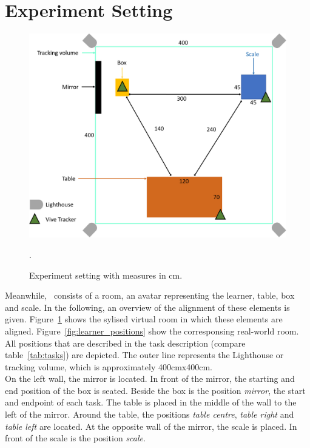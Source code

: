 \section{Experiment Setting}
\label{sec:experimentSetting}
\begin{figure}[H]
	\centering
	\includegraphics[width=\textwidth]{figures/study_setting.png}
	\caption[Experiment setting]{Experiment setting with measures in cm.}.
	\label{fig:study_setting}
\end{figure}
Meanwhile, \exgo\ consists of a room, an avatar representing the learner, table, box and scale. In the following, an overview of the alignment of these elements is given. Figure~\ref{fig:study_setting} shows the sylised virtual room in which these elements are aligned. Figure~\ref{fig:learner_positions} show the corresponsing real-world room. All positions that are described in the task description (compare table~\ref{tab:tasks}) are depicted. The outer line represents the Lighthouse or tracking volume, which is approximately 400cmx400cm.\\
On the left wall, the mirror is located. In front of the mirror, the starting and end position of the box is seated. Beside the box is the position \textit{mirror}, the start and endpoint of each task. The table is placed in the middle of the wall to the left of the mirror. Around the table, the positions \textit{table centre}, \textit{table right} and \textit{table left} are located. At the opposite wall of the mirror, the scale is placed. In front of the scale is the position \textit{scale}.
